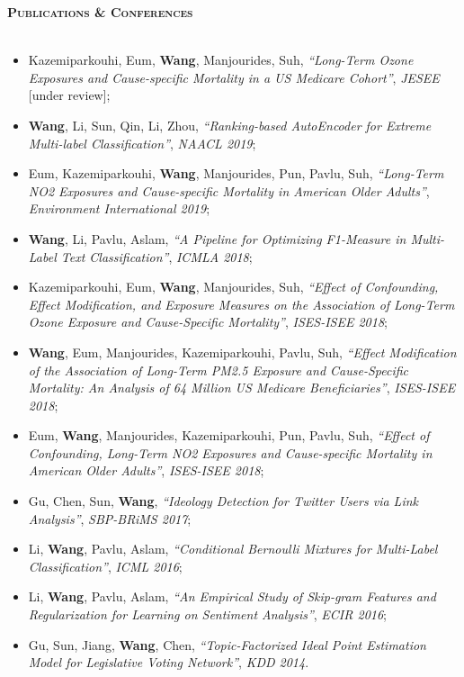 \documentclass[11pt]{article}
\newcommand{\lineunder}{\vspace*{-8pt} \\ \hspace*{-18pt} \hrulefill \\}
\newcommand{\header}[1]{{\hspace*{-15pt}\vspace*{6pt} \large \textsc{\textbf{#1}}} \vspace*{-6pt} \lineunder}
\begin{document}
\newpage

\header{Publications \& Conferences}
\begin{itemize}
\item Kazemiparkouhi, Eum, \textbf{Wang}, Manjourides, Suh, \textit{``Long-Term Ozone Exposures and Cause-specific Mortality in a US Medicare Cohort''}, {\emph{JESEE}} [under review];

\item \textbf{Wang}, Li, Sun, Qin, Li, Zhou, \textit{``Ranking-based AutoEncoder for Extreme Multi-label Classification''}, {\emph{NAACL 2019}};

\item Eum, Kazemiparkouhi, \textbf{Wang}, Manjourides, Pun, Pavlu, Suh, \textit{``Long-Term NO2 Exposures and Cause-specific Mortality in American Older Adults''}, {\emph{Environment International 2019}};

\item  \textbf{Wang}, Li, Pavlu, Aslam, \textit{``A Pipeline for Optimizing F1-Measure in Multi-Label Text Classification''}, {\emph{ICMLA 2018}};

\item Kazemiparkouhi, Eum, \textbf{Wang}, Manjourides, Suh, \textit{``Effect of Confounding, Effect Modification, and Exposure Measures on the Association of Long-Term Ozone Exposure and Cause-Specific Mortality''}, {\emph{ISES-ISEE 2018}};

\item  \textbf{Wang}, Eum, Manjourides, Kazemiparkouhi, Pavlu, Suh, \textit{``Effect Modification of the Association of Long-Term PM2.5 Exposure and Cause-Specific Mortality: An Analysis of 64 Million US Medicare Beneficiaries''}, {\emph{ISES-ISEE 2018}};

\item Eum, \textbf{Wang}, Manjourides, Kazemiparkouhi, Pun, Pavlu, Suh, \textit{``Effect of Confounding, Long-Term NO2 Exposures and Cause-specific Mortality in American Older Adults''}, {\emph{ISES-ISEE 2018}};

\item  Gu, Chen, Sun, \textbf{Wang}, \textit{``Ideology Detection for Twitter Users via Link Analysis''}, {\emph{SBP-BRiMS 2017}};

\item Li, \textbf{Wang}, Pavlu, Aslam, \textit{``Conditional Bernoulli Mixtures for Multi-Label Classification''}, {\emph{ICML 2016}};

\item Li, \textbf{Wang}, Pavlu, Aslam, \textit{``An Empirical Study of Skip-gram Features and Regularization for Learning on Sentiment Analysis''}, {\emph{ECIR 2016}};

\item Gu, Sun, Jiang, \textbf{Wang}, Chen, \textit{``Topic-Factorized Ideal Point Estimation Model for Legislative Voting Network''}, {\emph{KDD 2014}}.

\end{itemize}
\end{document}
